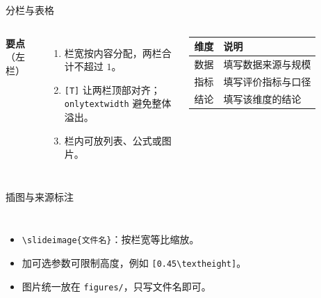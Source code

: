 \begin{frame}{分栏与表格}
  \begin{columns}[T,onlytextwidth]
      \textbf{要点}（左栏）
      \begin{enumerate}
        \item 栏宽按内容分配，两栏合计不超过 $1$。
        \item \texttt{[T]} 让两栏顶部对齐；\texttt{onlytextwidth} 避免整体溢出。
        \item 栏内可放列表、公式或图片。
      \end{enumerate}
      \small
      \begin{tabularx}{\linewidth}{@{}lY@{}}
        \toprule
        \textbf{维度} & \textbf{说明} \\
        \midrule
        数据 & 填写数据来源与规模 \\
        指标 & 填写评价指标与口径 \\
        结论 & 填写该维度的结论 \\
        \bottomrule
      \end{tabularx}
  \end{columns}
\end{frame}

\begin{frame}{插图与来源标注}
  \begin{columns}[T,onlytextwidth]
      \centering
      \begin{itemize}
        \item \texttt{\textbackslash slideimage\{文件名\}}：按栏宽等比缩放。
        \item 加可选参数可限制高度，例如 \texttt{[0.45\textbackslash textheight]}。
        \item 图片统一放在 \texttt{figures/}，只写文件名即可。
      \end{itemize}
  \end{columns}
\end{frame}

